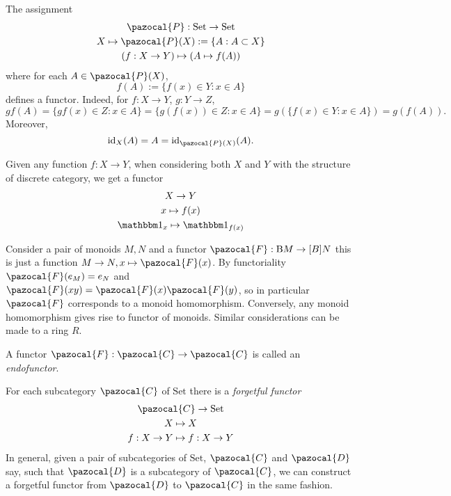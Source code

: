 \begin{example}
    The assignment 
    \begin{gather*}
        \pazocal{P}:\mathrm{Set} \rightarrow \mathrm{Set}\\
        X \mapsto \pazocal{P}(X):= \{A : A\subset X\}\\
        (f : X\rightarrow Y) \mapsto (A\mapsto f(A))
    \end{gather*}
    where for each $A\in \pazocal{P}(X)$,
    $$f(A):=\{f(x)\in Y : x \in A\}$$
    defines a functor. Indeed, for $f: X\rightarrow Y$, $g:Y\rightarrow Z$,
    $$gf(A)= \{gf(x)\in Z : x\in A\} = \{g(f(x)) \in Z : x\in A\} = g(\{f(x)\in Y : x\in A \})=g(f(A)). $$
    Moreover, 
    $$\id_X(A) = A = \id_{\pazocal{P}(X)}(A).$$
\end{example}
\begin{example}
    Given any function $f: X\rightarrow Y$, when considering both $X$ and $Y$ with the structure of discrete category, we get a functor 
    \begin{gather*}
        X\rightarrow Y\\
        x\mapsto f(x)\\
        \fone_x \mapsto \fone_{f(x)}
    \end{gather*}  
\end{example}
\begin{example}
    Consider a pair of monoids $M,N$ and a functor 
    $\pazocal{F} : \mathrm{B}M \rightarrow \mathrm[B]N$ this is just a function $M\rightarrow N,x\mapsto \pazocal{F}(x)$. By functoriality $\pazocal{F}(e_M)=e_N$ and $\pazocal{F}(xy)=\pazocal{F}(x)\pazocal{F}(y)$, so in particular $\pazocal{F}$ corresponds to a monoid homomorphism. Conversely, any monoid homomorphism gives rise to functor of monoids. Similar considerations can be made to a ring $R$.
\end{example}
\begin{definition}
    A functor $\pazocal{F} : \pazocal{C}\rightarrow \pazocal{C}$ is called an \emph{endofunctor}. 
\end{definition}
\begin{definition}
    For each subcategory $\pazocal{C}$ of $\mathrm{Set}$ there is a \emph{forgetful functor} 
    \begin{gather*}
        \pazocal{C} \rightarrow \mathrm{Set}\\
        X \mapsto X\\
        f : X \rightarrow Y \mapsto f : X \rightarrow Y
    \end{gather*}
    In general, given a pair of subcategories of $\mathrm{Set}$, $\pazocal{C}$ and $\pazocal{D}$ say, such that $\pazocal{D}$ is a subcategory of $\pazocal{C}$, we can construct a forgetful functor from $\pazocal{D}$ to $\pazocal{C}$ in the same fashion.   
\end{definition}
